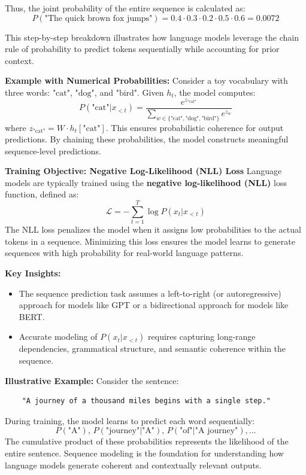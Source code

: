 \begin{flushleft}
    Thus, the joint probability of the entire sequence is calculated as:
    \[
    P(\text{"The quick brown fox jumps"}) = 0.4 \cdot 0.3 \cdot 0.2 \cdot 0.5 \cdot 0.6 = 0.0072
    \]

    This step-by-step breakdown illustrates how language models leverage the chain rule of probability to predict tokens sequentially while accounting for prior context.

    \textbf{Example with Numerical Probabilities:}
    Consider a toy vocabulary with three words: \(\text{"cat"}\), \(\text{"dog"}\), and \(\text{"bird"}\). Given \(h_t\), the model computes:
    \[
    P(\text{"cat"}|x_{<t}) = \frac{e^{z_{\text{"cat"}}}}{\sum_{w \in \{\text{"cat"}, \text{"dog"}, \text{"bird"}\}} e^{z_w}}
    \]
    where \(z_{\text{"cat"}} = W \cdot h_t[\text{"cat"}]\). This ensures probabilistic coherence for output predictions. By chaining these probabilities, the model constructs meaningful sequence-level predictions. \break

    \textbf{Training Objective: Negative Log-Likelihood (NLL) Loss}
    Language models are typically trained using the \textbf{negative log-likelihood (NLL)} loss function, defined as:
    \[
    \mathcal{L} = -\sum_{t=1}^T \log P(x_t | x_{<t})
    \]
    The NLL loss penalizes the model when it assigns low probabilities to the actual tokens in a sequence. Minimizing this loss ensures the model learns to generate sequences with high probability for real-world language patterns.

    \textbf{Key Insights:}
    \begin{itemize}
        \item The sequence prediction task assumes a left-to-right (or autoregressive) approach for models like GPT or a bidirectional approach for models like BERT.
        \item Accurate modeling of \(P(x_t | x_{<t})\) requires capturing long-range dependencies, grammatical structure, and semantic coherence within the sequence.
    \end{itemize}

    \textbf{Illustrative Example:}
    Consider the sentence:
    \begin{verbatim}
    "A journey of a thousand miles begins with a single step."
    \end{verbatim}
    During training, the model learns to predict each word sequentially:
    \[
    P(\text{"A"}), \, P(\text{"journey"} | \text{"A"}), \, P(\text{"of"} | \text{"A journey"}), \dots
    \]
    The cumulative product of these probabilities represents the likelihood of the entire sentence. Sequence modeling is the foundation for understanding how language models generate coherent and contextually relevant outputs.
\end{flushleft}

